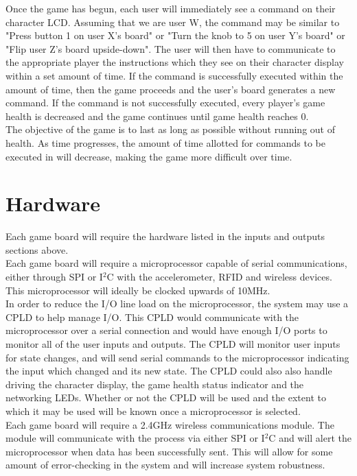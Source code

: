\documentclass[aps,letterpaper,10pt]{revtex4}
\begin{document}
Once the game has begun, each user will immediately see a command on their character LCD. Assuming that we are user W, the command may be similar to "Press button 1 on user X's board" or "Turn the knob to 5 on user Y's board" or "Flip user Z's board upside-down". The user will then have to communicate to the appropriate player the instructions which they see on their character display within a set amount of time. If the command is successfully executed within the amount of time, then the game proceeds and the user's board generates a new command. If the command is not successfully executed, every player's game health is decreased and the game continues until game health reaches 0. \\

The objective of the game is to last as long as possible without running out of health. As time progresses, the amount of time allotted for commands to be executed in will decrease, making the game more difficult over time. \\

\section{Hardware}

Each game board will require the hardware listed in the inputs and outputs sections above. \\

Each game board will require a microprocessor capable of serial communications, either through SPI or I$^2$C with the accelerometer, RFID and wireless devices. This microprocessor will ideally be clocked upwards of 10MHz.\\

In order to reduce the I/O line load on the microprocessor, the system may use a CPLD to help manage I/O. This CPLD would communicate with the microprocessor over a serial connection and would have enough I/O ports to monitor all of the user inputs and outputs. The CPLD will monitor user inputs for state changes, and will send serial commands to the microprocessor indicating the input which changed and its new state. The CPLD could also also handle driving the character display, the game health status indicator and the networking LEDs. Whether or not the CPLD will be used and the extent to which it may be used will be known once a microprocessor is selected.\\

Each game board will require a 2.4GHz wireless communications module. The module will communicate with the process via either SPI or I$^2$C and will alert the microprocessor when data has been successfully sent. This will allow for some amount of error-checking in the system and will increase system robustness. \\
\end{document}

